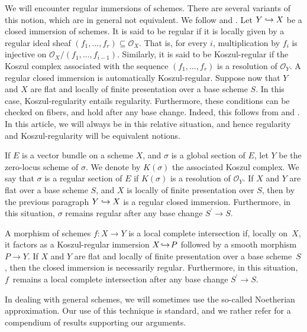 \documentclass[JEP,XML,SOM,Unicode,published]{cedram}
\newcommand\hto{\mathrel{\lhook\joinrel\to}}
\theoremstyle{plain}
\theoremstyle{definition}
\newcommand{\Ocal}{\mathcal O}
\begin{document}
We will encounter regular immersions of schemes. There are several variants of this notion, which are in general not equivalent. We follow \cite[\href{https://stacks.math.columbia.edu/tag/0638}{0638}]{stacks-project} and \cite[\href{https://stacks.math.columbia.edu/tag/067M}{067M}]{stacks-project}. Let $Y\hto X$ be a closed immersion of schemes. It is said to be regular if it is locally given by a regular ideal sheaf $(f_{1},\ldots, f_{r})\subseteq\Ocal_{X}$. That is, for every $i$, multiplication by $f_{i}$ is injective on $\Ocal_{X}/(f_{1},\ldots, f_{i-1})$. Similarly, it is said to be Koszul-regular if the Koszul complex associated with the sequence $(f_{1},\ldots, f_{r})$ is a resolution of $\Ocal_{Y}$. A regular closed immersion is automatically Koszul-regular. Suppose now that $Y$ and $X$ are flat and locally of finite presentation over a base scheme $S$. In this case, Koszul-regularity entails regularity. Furthermore, these conditions can be checked on fibers, and hold after any base change. Indeed, this follows from \cite[\href{https://stacks.math.columbia.edu/tag/063K}{063K}]{stacks-project} and \cite[Prop.\,19.2.4]{EGAIV4}. In this article, we will always be in this relative situation, and hence regularity and Koszul-regularity will be equivalent notions.

If $E$ is a vector bundle on a scheme $X$, and $\sigma$ is a global section of $E$, let $Y$ be the zero-locus scheme of $\sigma$. We denote by $K(\sigma)$ the associated Koszul complex. We say that $\sigma$ is a regular section of $E$ if $K(\sigma)$ is a resolution of $\Ocal_{Y}$. If $X$ and $Y$ are flat over a base scheme $S$, and $X$ is locally of finite presentation over $S$, then by the previous paragraph $Y\hto X$ is a regular closed immersion. Furthermore, in this situation, $\sigma$ remains regular after any base change $S^{\prime}\to S$.\enlargethispage{-2\baselineskip}%

A morphism of schemes $f\colon X\to Y$ is a local complete intersection if, locally on~$X$, it factors as a Koszul-regular immersion $X\!\hto\! P$ followed by a smooth morphism $P\!\to\! Y$. If $X$ and $Y$ are flat and locally of finite presentation over a base scheme~$S$, then the closed immersion is necessarily regular. Furthermore, in this situation, $f$~remains a local complete intersection after any base change $S^{\prime}\to S$.

In dealing with general schemes, we will sometimes use the so-called Noetherian approximation. Our use of this technique is standard, and we rather refer \cite[\href{https://stacks.math.columbia.edu/tag/01YT}{01YT}]{stacks-project} for a compendium of results supporting our arguments.
\end{document}
